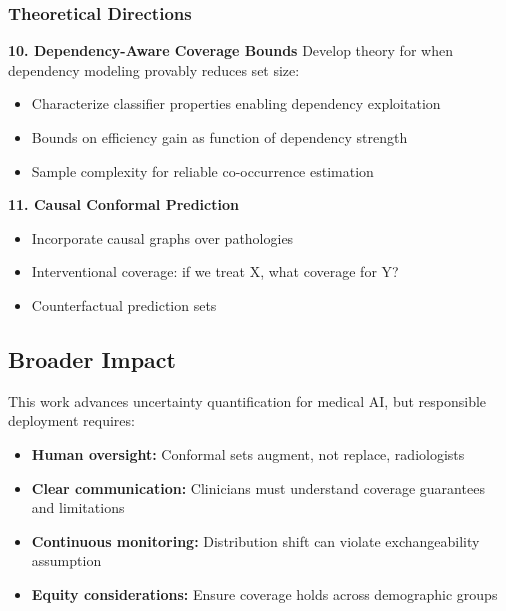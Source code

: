 \subsubsection{Theoretical Directions}

\textbf{10. Dependency-Aware Coverage Bounds}
Develop theory for when dependency modeling provably reduces set size:
\begin{itemize}
    \item Characterize classifier properties enabling dependency exploitation
    \item Bounds on efficiency gain as function of dependency strength
    \item Sample complexity for reliable co-occurrence estimation
\end{itemize}

\textbf{11. Causal Conformal Prediction}
\begin{itemize}
    \item Incorporate causal graphs over pathologies
    \item Interventional coverage: if we treat X, what coverage for Y?
    \item Counterfactual prediction sets
\end{itemize}

\subsection{Broader Impact}

This work advances uncertainty quantification for medical AI, but responsible deployment requires:
\begin{itemize}
    \item \textbf{Human oversight:} Conformal sets augment, not replace, radiologists
    \item \textbf{Clear communication:} Clinicians must understand coverage guarantees and limitations
    \item \textbf{Continuous monitoring:} Distribution shift can violate exchangeability assumption
    \item \textbf{Equity considerations:} Ensure coverage holds across demographic groups
\end{itemize}
